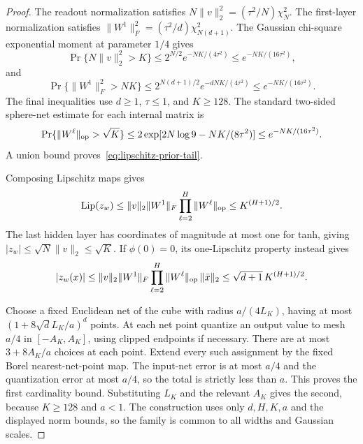 \begin{proof}
The readout normalization satisfies
$N\|v\|_2^2=(\tau^2/N)\chi_N^2$.
The first-layer normalization satisfies
$\|W^1\|_F^2=(\tau^2/d)\chi_{N(d+1)}^2$.
The Gaussian chi-square exponential moment at parameter $1/4$ gives
\[
 \Pr\{N\|v\|_2^2>K\}
       \leq2^{N/2}e^{-NK/(4\tau^2)}
       \leq e^{-NK/(16\tau^2)},
\]
and
\[
 \Pr\{\|W^1\|_F^2>NK\}
       \leq2^{N(d+1)/2}e^{-dNK/(4\tau^2)}
       \leq e^{-NK/(16\tau^2)}.
\]
The final inequalities use $d\geq1$, $\tau\leq1$, and $K\geq128$.
The standard two-sided sphere-net estimate for each internal matrix is
\[
 \Pr\{\|W^\ell\|_{\rm op}>\sqrt K\}
 \leq2\exp[2N\log9-NK/(8\tau^2)]
 \leq e^{-NK/(16\tau^2)}.
\]
A union bound proves~\eqref{eq:lipschitz-prior-tail}.

Composing Lipschitz maps gives
\[
 \operatorname{Lip}(z_w)
 \leq\|v\|_2\|W^1\|_F
                      \prod_{\ell=2}^H\|W^\ell\|_{\rm op}
 \leq K^{(H+1)/2}.
\]
The last hidden layer has coordinates of magnitude at most one for
tanh, giving $|z_w|\leq\sqrt N\|v\|_2\leq\sqrt K$.
If $\phi(0)=0$, its one-Lipschitz property instead gives
\[
 |z_w(x)|\leq\|v\|_2\|W^1\|_F
           \prod_{\ell=2}^H\|W^\ell\|_{\rm op}\,\|\bar x\|_2
 \leq\sqrt{d+1}\,K^{(H+1)/2}.
\]

Choose a fixed Euclidean net of the cube with radius $a/(4L_K)$,
having at most $(1+8\sqrt d L_K/a)^d$ points.  At each net point
quantize an output value to mesh $a/4$ in $[-A_K,A_K]$, using clipped
endpoints if necessary.  There are at most $3+8A_K/a$ choices at
each point.  Extend every such assignment by the fixed Borel
nearest-net-point map.  The input-net error is at most $a/4$ and the
quantization error at most $a/4$, so the total is strictly less than
$a$.  This proves the first cardinality bound.  Substituting $L_K$
and the relevant $A_K$ gives the second, because $K\geq128$ and
$a<1$.  The construction uses only $d,H,K,a$ and the displayed norm
bounds, so the family is common to all widths and Gaussian scales.
\end{proof}

